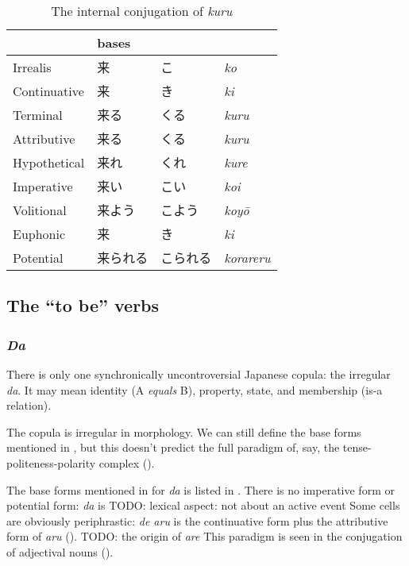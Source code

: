 \documentclass[UTF8, a4paper, oneside, scheme=plain]{ctexrep}
\newcommand{\corpus}[1]{\emph{#1}}
\begin{document}
\begin{table}[H]
\caption{The internal conjugation of \corpus{kuru}}
\label{tbl:kuru-table}
\centering
\begin{tabular}{llll}
\toprule
                & \multicolumn{3}{l}{bases} \\ \midrule
Irrealis     & 来             & こ               & \corpus{ko}               \\
Continuative & 来             & き               & \corpus{ki}               \\
Terminal     & 来る            & くる            & \corpus{kuru}             \\
Attributive  & 来る            & くる            & \corpus{kuru}             \\
Hypothetical & 来れ            & くれ            & \corpus{kure}             \\
Imperative   & 来い            & こい            & \corpus{koi}              \\
Volitional   & 来よう           & こよう         & \corpus{koyō}             \\
Euphonic     & 来             & き              & \corpus{ki}               \\
Potential    & 来られる          & こられる      & \corpus{korareru}        \\ 
\bottomrule
\end{tabular}
\end{table}

\subsection{The ``to be'' verbs}

\subsubsection{\corpus{Da}}\label{sec:copula-da}

There is only one synchronically uncontroversial Japanese copula:
the irregular \corpus{da}.
It may mean identity (A \emph{equals} B),
property, state, and membership (is-a relation).

The copula is irregular in morphology.
We can still define the base forms mentioned in ,
but this doesn't predict the full paradigm of,
say, the tense-politeness-polarity complex ().

The base forms mentioned in  for \corpus{da} is listed 
in .
There is no imperative form or potential form:
\corpus{da} is TODO: lexical aspect: not about an active event 
Some cells are obviously periphrastic:
\corpus{de aru} is the continuative form plus the attributive form of \corpus{aru} ().
TODO: the origin of \corpus{are}
This paradigm is seen in the conjugation of adjectival nouns ().
\end{document}
